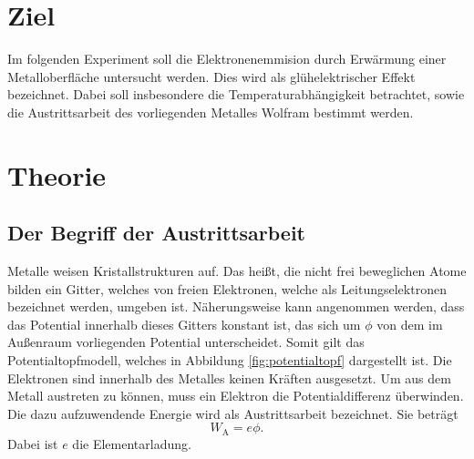 \section{Ziel}
\label{sec:Ziel}
Im folgenden Experiment soll die Elektronenemmision durch Erwärmung einer Metalloberfläche untersucht werden. Dies wird als glühelektrischer Effekt bezeichnet. Dabei soll insbesondere die Temperaturabhängigkeit betrachtet, sowie die Austrittsarbeit des vorliegenden Metalles Wolfram bestimmt werden.

\section{Theorie}
\label{sec:theorie}

\subsection{Der Begriff der Austrittsarbeit}

Metalle weisen Kristallstrukturen auf. Das heißt, die nicht frei beweglichen Atome bilden ein Gitter, welches von freien Elektronen, welche als Leitungselektronen bezeichnet werden, umgeben ist. Näherungsweise kann angenommen werden, dass das Potential innerhalb dieses Gitters konstant ist, das sich um $\phi$ von dem im Außenraum vorliegenden Potential unterscheidet. Somit gilt das Potentialtopfmodell, welches in Abbildung \ref{fig:potentialtopf} dargestellt ist. Die Elektronen sind innerhalb des Metalles keinen Kräften ausgesetzt. Um aus dem Metall austreten zu können, muss ein Elektron die Potentialdifferenz überwinden. Die dazu aufzuwendende Energie wird als Austrittsarbeit bezeichnet. Sie beträgt
\begin{equation}
  W_\mathrm{A}= e \phi.
\end{equation}
Dabei ist $e$ die Elementarladung.

